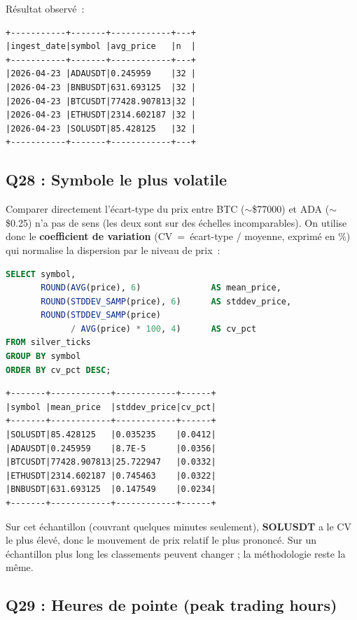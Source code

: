 \documentclass{RapportINPTCLOUD}
\begin{document}
R\'{e}sultat observ\'{e}~:
\begin{lstlisting}[style=code]
+-----------+-------+------------+---+
|ingest_date|symbol |avg_price   |n  |
+-----------+-------+------------+---+
|2026-04-23 |ADAUSDT|0.245959    |32 |
|2026-04-23 |BNBUSDT|631.693125  |32 |
|2026-04-23 |BTCUSDT|77428.907813|32 |
|2026-04-23 |ETHUSDT|2314.602187 |32 |
|2026-04-23 |SOLUSDT|85.428125   |32 |
+-----------+-------+------------+---+
\end{lstlisting}

\subsection{Q28 : Symbole le plus volatile}

Comparer directement l'\'{e}cart-type du prix entre BTC ($\sim$\$77000) et ADA ($\sim$\$0.25) n'a pas de sens (les deux sont sur des \'{e}chelles incomparables). On utilise donc le \textbf{coefficient de variation} (CV~=~\'{e}cart-type / moyenne, exprim\'{e} en \%) qui normalise la dispersion par le niveau de prix~:

\begin{lstlisting}[style=code, language=SQL]
SELECT symbol,
       ROUND(AVG(price), 6)              AS mean_price,
       ROUND(STDDEV_SAMP(price), 6)      AS stddev_price,
       ROUND(STDDEV_SAMP(price)
             / AVG(price) * 100, 4)      AS cv_pct
FROM silver_ticks
GROUP BY symbol
ORDER BY cv_pct DESC;
\end{lstlisting}

\begin{lstlisting}[style=code]
+-------+------------+------------+------+
|symbol |mean_price  |stddev_price|cv_pct|
+-------+------------+------------+------+
|SOLUSDT|85.428125   |0.035235    |0.0412|
|ADAUSDT|0.245959    |8.7E-5      |0.0356|
|BTCUSDT|77428.907813|25.722947   |0.0332|
|ETHUSDT|2314.602187 |0.745463    |0.0322|
|BNBUSDT|631.693125  |0.147549    |0.0234|
+-------+------------+------------+------+
\end{lstlisting}

Sur cet \'{e}chantillon (couvrant quelques minutes seulement), \textbf{SOLUSDT} a le CV le plus \'{e}lev\'{e}, donc le mouvement de prix relatif le plus prononc\'{e}. Sur un \'{e}chantillon plus long les classements peuvent changer ; la m\'{e}thodologie reste la m\^{e}me.

\subsection{Q29 : Heures de pointe (peak trading hours)}
\end{document}
